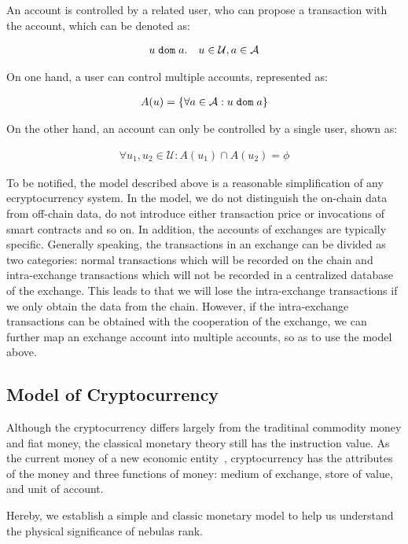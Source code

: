 An account is controlled by a related user, who can propose a transaction with the account, which can be denoted as:

\begin{align}
u {\; \texttt{dom}\;} a. \quad u\in \mathcal{U}, a\in \mathcal{A}
\end{align}

\noindent On one hand, a user can control multiple accounts, represented as:

\begin{align}
A(u) = \{\forall a\in \mathcal{A} : u {\; \texttt{dom}\;} a\}
\end{align}

\noindent On the other hand, an account can only be controlled by a single user, shown as:

\begin{align}
\forall u_1, u_2 \in \mathcal{U} : A(u_1) \cap A(u_2) = \phi
\end{align}

To be notified, the model described above is a reasonable simplification of any ecryptocurrency system. In the model, we do not distinguish the on-chain data from off-chain data, do not introduce either transaction price or invocations of smart contracts and so on. In addition, the accounts of exchanges are typically specific. Generally speaking, the transactions in an exchange can be divided as two categories: normal transactions which will be recorded on the chain and intra-exchange transactions which will not be recorded in a centralized database of the exchange. This leads to that we will lose the intra-exchange transactions if we only obtain the data from the chain. 
However, if the intra-exchange transactions can be obtained with the cooperation of the exchange, we can further map an exchange account into multiple accounts, so as to use the model above.


\subsection{Model of Cryptocurrency}
Although the cryptocurrency differs largely from the traditinal commodity money and fiat money, the classical monetary theory still has the instruction value. As the current money of a new economic entity~\cite{swan2015blockchain}, cryptocurrency has the attributes of the money and three functions of money: medium of exchange, store of value, and unit of account. 

Hereby, we establish a simple and classic monetary model to help us understand the physical significance of nebulas rank.

